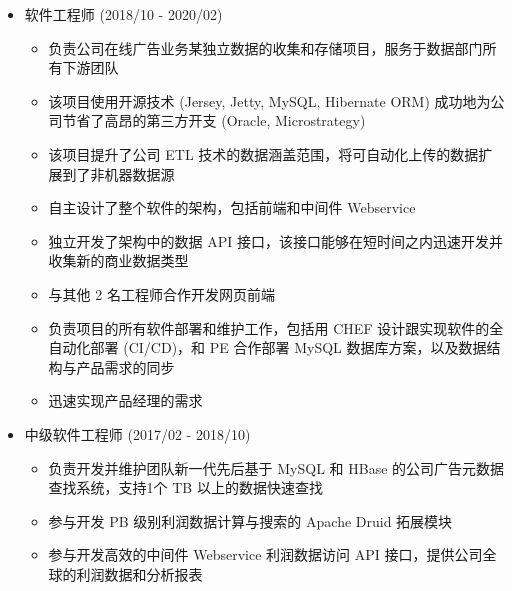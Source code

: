 \documentclass[10pt,a4paper,ragged2e,withhyper]{altacv}
\begin{document}

    \begin{itemize}
    \item 软件工程师 (2018/10 - 2020/02)
    \begin{itemize}
        \item 负责公司在线广告业务某独立数据的收集和存储项目，服务于数据部门所有下游团队
        \item 该项目使用开源技术 (Jersey, Jetty, MySQL, Hibernate ORM) 成功地为公司节省了高昂的第三方开支    (Oracle, Microstrategy)
        \item 该项目提升了公司 ETL 技术的数据涵盖范围，将可自动化上传的数据扩展到了非机器数据源
        \item 自主设计了整个软件的架构，包括前端和中间件 Webservice
        \item 独立开发了架构中的数据 API 接口，该接口能够在短时间之内迅速开发并收集新的商业数据类型
        \item 与其他 2 名工程师合作开发网页前端
        \item 负责项目的所有软件部署和维护工作，包括用 CHEF 设计跟实现软件的全自动化部署 (CI/CD)，和 PE 合作部署 MySQL 数据库方案，以及数据结构与产品需求的同步
        \item 迅速实现产品经理的需求
    \end{itemize}
    \item 中级软件工程师 (2017/02 - 2018/10)
    \begin{itemize}
        \item 负责开发并维护团队新一代先后基于 MySQL 和 HBase 的公司广告元数据查找系统，支持1个 TB 以上的数据快速查找
        \item 参与开发 PB 级别利润数据计算与搜索的 Apache Druid 拓展模块
        \item 参与开发高效的中间件 Webservice 利润数据访问 API 接口，提供公司全球的利润数据和分析报表

\end{itemize}
\end{itemize}
\end{document}
